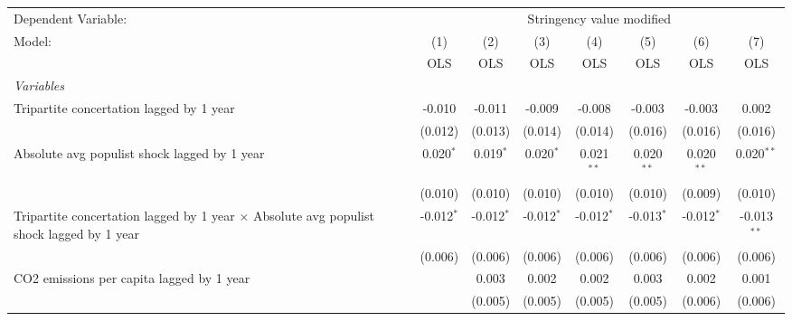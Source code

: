 
\begingroup
\centering
\begin{tabular}{lccccccc}
   \toprule
   Dependent Variable: & \multicolumn{7}{c}{Stringency value modified}\\
   Model:                                                                                          & (1)          & (2)          & (3)          & (4)          & (5)          & (6)          & (7)\\  
                                                                                                   &  OLS         & OLS          & OLS          & OLS          & OLS          & OLS          & OLS\\  
   \midrule
   \emph{Variables}\\
   Tripartite concertation lagged by 1 year                                                        & -0.010       & -0.011       & -0.009       & -0.008       & -0.003       & -0.003       & 0.002\\   
                                                                                                   & (0.012)      & (0.013)      & (0.014)      & (0.014)      & (0.016)      & (0.016)      & (0.016)\\   
   Absolute avg populist shock lagged by 1 year                                                    & 0.020$^{*}$  & 0.019$^{*}$  & 0.020$^{*}$  & 0.021$^{**}$ & 0.020$^{**}$ & 0.020$^{**}$ & 0.020$^{**}$\\   
                                                                                                   & (0.010)      & (0.010)      & (0.010)      & (0.010)      & (0.010)      & (0.009)      & (0.010)\\   
   Tripartite concertation lagged by 1 year $\times$ Absolute avg populist shock lagged by 1 year  & -0.012$^{*}$ & -0.012$^{*}$ & -0.012$^{*}$ & -0.012$^{*}$ & -0.013$^{*}$ & -0.012$^{*}$ & -0.013$^{**}$\\   
                                                                                                   & (0.006)      & (0.006)      & (0.006)      & (0.006)      & (0.006)      & (0.006)      & (0.006)\\   
   CO2 emissions per capita lagged by 1 year                                                       &              & 0.003        & 0.002        & 0.002        & 0.003        & 0.002        & 0.001\\   
                                                                                                   &              & (0.005)      & (0.005)      & (0.005)      & (0.005)      & (0.006)      & (0.006)\\   

\end{tabular}
